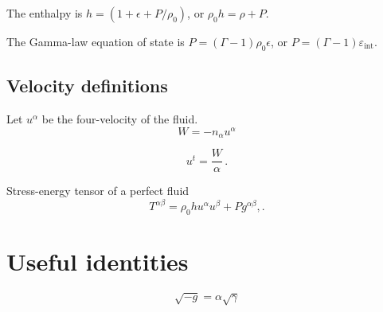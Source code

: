 \documentclass[]{scrartcl}
\begin{document}
The enthalpy is $h = (1 + \epsilon + P\slash \rho_0)$, or $\rho_0 h = \rho + P$.

The Gamma-law equation of state is $P = (\Gamma - 1) \rho_0 \epsilon$, or $P = (\Gamma - 1) \varepsilon_{\text{int}}$.


\subsection{Velocity definitions}
\label{sec:velocity-definitions}

Let $u^\alpha$ be the four-velocity of the fluid.
\begin{equation}
  \label{eq:10}
  W = -n_\alpha u^\alpha
\end{equation}

\begin{equation}
  \label{eq:7}
  u^t = \frac{W}{\alpha}\,.
\end{equation}



Stress-energy tensor of a perfect fluid
\begin{equation}
  \label{eq:8}
  T^{\alpha\beta} = \rho_0 h u^\alpha u^\beta + P g^{\alpha\beta},.
\end{equation}

\section{Useful identities}
\label{sec:useful-identities}

\begin{equation}
  \label{eq:3}
  \sqrt{-g} = \alpha \sqrt{\gamma}
\end{equation}
\end{document}
